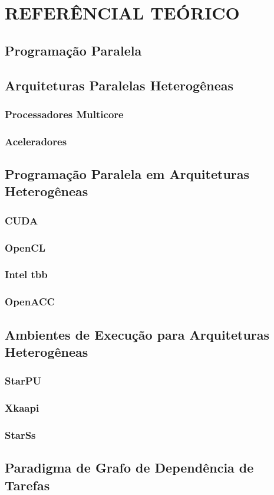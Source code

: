 
\chapter{REFERÊNCIAL TEÓRICO}
\label{chap:ref-teorico}

\section{Programação Paralela}

\section{Arquiteturas Paralelas Heterogêneas}
\subsection{Processadores Multicore}
\subsection{Aceleradores}

\section{Programação Paralela em Arquiteturas Heterogêneas}
\subsection{CUDA}
\subsection{OpenCL}
\subsection{Intel tbb}
\subsection{OpenACC}

\section{Ambientes de Execução para Arquiteturas Heterogêneas}
\subsection{StarPU}
\subsection{Xkaapi}
\subsection{StarSs}

\section{Paradigma de Grafo de Dependência de Tarefas}